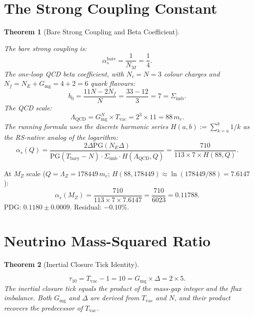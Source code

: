 \documentclass[11pt,letterpaper]{article}
\theoremstyle{plain}
\newtheorem{theorem}{Theorem}[section]
\theoremstyle{definition}
\theoremstyle{remark}
\newcommand{\Tbary}{T_{\mathrm{bary}}}
\newcommand{\Sigimb}{\Sigma_{\mathrm{imb}}}
\newcommand{\PG}{\mathrm{PG}}
\newcommand{\Gmg}{G_{\mathrm{mg}}}
\newcommand{\Tvac}{T_{\mathrm{vac}}}
\newcommand{\tauX}{\tau_{10}}
\newcommand{\LambdaZ}{\Lambda_Z}
\newcommand{\alphaSbare}{\alpha_s^{\mathrm{bare}}}
\begin{document}
\section{The Strong Coupling Constant}\label{sec:strong}

\begin{theorem}[Bare Strong Coupling and Beta
Coefficient]\label{thm:alphas}
\begin{rsbox}
The bare strong coupling is:
\[
\alphaSbare=\frac{1}{N_M}=\frac{1}{4}.
\]
The one-loop QCD beta coefficient, with $N_c=N=3$ colour charges
and $N_f=N_E+\Gmg=4+2=6$ quark flavours:
\[
b_0=\frac{11N-2N_f}{N}=\frac{33-12}{3}=7=\Sigimb.
\]
The QCD scale:
\[
\Lambda_{\mathrm{QCD}}=\Gmg^N\times\Tvac=2^3\times11=88\,m_e.
\]
The running formula uses the discrete harmonic series
$H(a,b):=\sum_{k=a}^{b}1/k$ as the RS-native analog of the
logarithm:
\[
\alpha_s(Q)=\frac{2\Delta\PG(N_E\Delta)}
{\PG(\Tbary-N)\cdot\Sigimb\cdot H(\Lambda_{\mathrm{QCD}},Q)}
=\frac{710}{113\times7\times H(88,Q)}.
\]
\end{rsbox}
\end{theorem}

\begin{verifybox}
At $M_Z$ scale ($Q=\LambdaZ=178449\,m_e$;
$H(88,178449)\approx\ln(178449/88)=7.6147$):
\[
\alpha_s(M_Z)=\frac{710}{113\times7\times7.6147}=\frac{710}{6023}=0.11788.
\]
PDG: $0.1180\pm0.0009$.  Residual: $-0.10\%$.
\end{verifybox}

\section{Neutrino Mass-Squared Ratio}\label{sec:neutrino}

\begin{theorem}[Inertial Closure Tick Identity]\label{thm:tau10-identity}
\begin{rsbox}
\[
\tauX=\Tvac-1=10=\Gmg\times\Delta=2\times5.
\]
The inertial closure tick equals the product of the mass-gap integer
and the flux imbalance.  Both $\Gmg$ and $\Delta$ are derived from
$\Tvac$ and $N$, and their product recovers the predecessor of $\Tvac$.
\end{rsbox}
\end{theorem}
\end{document}
